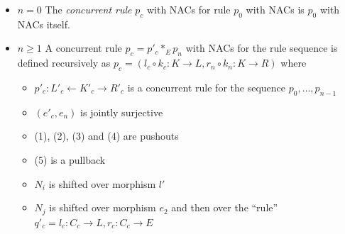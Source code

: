 \begin{itemize}
\item $n = 0$ The \emph{concurrent rule} $p_c$ with NACs for rule $p_0$ with NACs is $p_0$ with NACs itself.
\item $n \geqslant 1$ A concurrent rule $p_c = p'_c \ast_E p_n $ with NACs for the rule sequence  is defined recursively as $p_c = (l_c \circ k_c : K \rightarrow L, r_n \circ k_n : K \rightarrow R)$ where 
  \begin{itemize}
  \item $p'_c : L'_c \leftarrow K'_c \rightarrow R'_c$ is a concurrent rule for the sequence $p_0,\ldots,p_{n-1}$
  \item $(e'_c,e_n)$ is jointly surjective
  \item (1), (2), (3) and (4) are pushouts
  \item (5) is a pullback
  \item $N_i$ is shifted over morphism $l'$
  \item $N_j$ is shifted over morphism $e_2$ and then over the ``rule'' $q'_c = l_c : C_c \rightarrow L, r_c : C_c \rightarrow E$
  \end{itemize}
\end{itemize}

